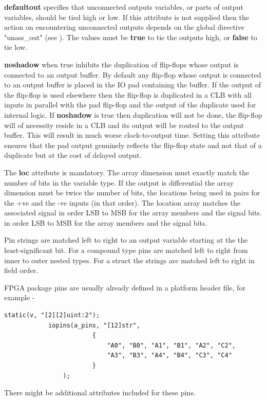         {\bf defaultout} specifies that unconnected outputs variables, or parts of
        output variables, should be tied high or low. If this attribute is not
        supplied then the action on encountering unconnected outputs depends on the
        global directive "unass\_out" (see ). The values
        must be {\bf true} to tie the outputs high, or {\bf false} to tie low.
        
        {\bf noshadow} when true inhibits the duplication of flip-flops
        whose output is connected to an output buffer. By default any
        flip-flop whose output is connected to an output buffer is placed
        in the IO pad containing the buffer. If the output of the flip-flop
        is used elsewhere then the flip-flop is duplicated in a CLB with
        all inputs in parallel with the pad flip-flop and the output of the
        duplicate used for internal logic. If {\bf noshadow} is true then
        duplication will not be done, the flip-flop will of necessity
        reside in a CLB and its output will be routed to the output buffer.
        This will result in much worse clock-to-output time. Setting this
        attribute ensures that the pad output genuinely reflects the
        flip-flop state and not that of a duplicate but at the cost of
        delayed output.
       
        The {\bf loc} attribute is mandatory. The array dimension
        must exactly match the number of bits in the variable type. If the output
        is differential the array dimension must be twice the number of
        bits, the locations being used in pairs for the +ve and the -ve inputs
        (in that order). The location array matches the associated signal
        in order LSB to MSB for the array members and the signal bits.
        in order LSB to MSB for the array members and the signal bits.
            
        Pin strings are matched left to right to an output variable
        starting at the the least-significant bit. For a compound type pins are
        matched left to right from inner to outer nested types. For a struct the
        strings are matched left to right in field order.

        FPGA package pins are usually already defined in a platform header file,
        for example -
        \begin{lstlisting}[gobble=12, language=threepl]
            static(v, "[2][2]uint:2");
            iopins(a_pins, "[12]str",
                        {
                            "A0", "B0", "A1", "B1", "A2", "C2",
                            "A3", "B3", "A4", "B4", "C3", "C4"
                        }
                );
        \end{lstlisting}
        There might be additional attributes included for these pins.

